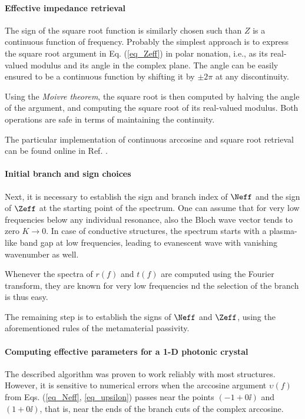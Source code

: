 \paragraph{Effective impedance retrieval} %
The sign of the square root function is similarly chosen such than $Z$ is a continuous function of frequency. Probably the simplest approach is to express the square root argument in Eq. (\ref{eq_Zeff}) in polar nonation, i.e., as its real-valued modulus and its angle in the complex plane. The angle can be easily ensured to be a continuous function by shifting it by $\pm 2\pi$ at any discontinuity.

Using the \textit{Moivre theorem}, the square root is then computed by halving the angle of the argument, and computing the square root of its real-valued modulus. Both operations are safe in terms of maintaining the continuity.

The particular implementation of continuous arccosine and square root retrieval can be found online in Ref. \cite[\texttt{effparam.py} file]{dominec2014_meep_metamaterials}.

\paragraph{Initial branch and sign choices}%
Next, it is necessary to establish the sign and branch index of $\Neff$ and the sign of $\Zeff$ at the starting point of the spectrum. One can assume that for very low frequencies below any individual resonance, also the Bloch wave vector tends to zero $K\rightarrow 0$. In case of conductive structures, the spectrum starts with a plasma-like band gap at low frequencies, leading to evanescent wave with vanishing wavenumber as well.

Whenever the spectra of $r(f)$ and $t(f)$ are computed using the Fourier transform, they are known for very low frequencies  nd the selection of the branch is thus easy.

The remaining step is to establish the signs of $\Neff$ and $\Zeff$, using the aforementioned rules of the metamaterial passivity.

\paragraph{Computing effective parameters for a 1-D photonic crystal}%
The described algorithm was proven to work reliably with most structures. However, it is sensitive to numerical errors 
when the arccosine argument $\upsilon(f)$ from Eqs. (\ref{eq_Neff}, \ref{eq_upsilon}) passes 
near the points $(-1+0\ii)$ and $(1+0\ii)$, that is, near the ends of the branch cuts of the complex arccosine.

